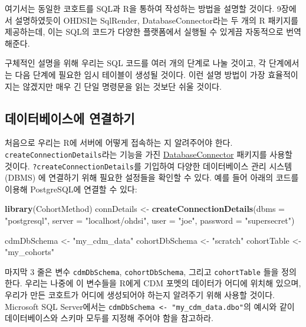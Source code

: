 \documentclass[11pt]{book}
\newenvironment{Shaded}{\begin{snugshade}}{\end{snugshade}}
\newcommand{\KeywordTok}[1]{\textcolor[rgb]{0.13,0.29,0.53}{\textbf{#1}}}
\newcommand{\DataTypeTok}[1]{\textcolor[rgb]{0.13,0.29,0.53}{#1}}
\newcommand{\StringTok}[1]{\textcolor[rgb]{0.31,0.60,0.02}{#1}}
\newcommand{\NormalTok}[1]{#1}
\theoremstyle{definition}
\theoremstyle{definition}
\theoremstyle{definition}
\theoremstyle{remark}
\begin{document}
여기서는 동일한 코호트를 SQL과 R을 통하여 작성하는 방법을 설명할 것이다.
9장에서 설명하였듯이 OHDSI는 SqlRender, DatabaseConnector라는 두 개의 R
패키지를 제공하는데, 이는 SQL의 코드가 다양한 플랫폼에서 실행될 수
있게끔 자동적으로 번역해준다.

구체적인 설명을 위해 우리는 SQL 코드를 여러 개의 단계로 나눌 것이고, 각
단계에서는 다음 단계에 필요한 임시 테이블이 생성될 것이다. 이런 설명
방법이 가장 효율적이지는 않겠지만 매우 긴 단일 명령문을 읽는 것보단 쉬울
것이다.

\subsection{데이터베이스에 연결하기}\label{-}

처음으로 우리는 R에 서버에 어떻게 접속하는 지 알려주어야 한다.
\texttt{createConnectionDetails}라는 기능을 가진
\href{https://ohdsi.github.io/DatabaseConnector/}{DatabaseConnector}
패키지를 사용할 것이다. \texttt{?createConnectionDetails}를 기입하여
다양한 데이터베이스 관리 시스템 (DBMS) 에 연결하기 위해 필요한 설정들을
확인할 수 있다. 예를 들어 아래의 코드를 이용해 PostgreSQL에 연결할 수
있다:

\begin{Shaded}
\begin{Highlighting}[]
\KeywordTok{library}\NormalTok{(CohortMethod)}
\NormalTok{connDetails <-}\StringTok{ }\KeywordTok{createConnectionDetails}\NormalTok{(}\DataTypeTok{dbms =} \StringTok{"postgresql"}\NormalTok{,}
                                       \DataTypeTok{server =} \StringTok{"localhost/ohdsi"}\NormalTok{,}
                                       \DataTypeTok{user =} \StringTok{"joe"}\NormalTok{,}
                                       \DataTypeTok{password =} \StringTok{"supersecret"}\NormalTok{)}

\NormalTok{cdmDbSchema <-}\StringTok{ "my_cdm_data"}
\NormalTok{cohortDbSchema <-}\StringTok{ "scratch"}
\NormalTok{cohortTable <-}\StringTok{ "my_cohorts"}
\end{Highlighting}
\end{Shaded}

마지막 3 줄은 변수 \texttt{cdmDbSchema}, \texttt{cohortDbSchema}, 그리고
\texttt{cohortTable} 들을 정의한다. 우리는 나중에 이 변수들을 R에게 CDM
포멧의 데이터가 어디에 위치해 있으며, 우리가 만든 코호트가 어디에
생성되어야 하는지 알려주기 위해 사용할 것이다. Microsoft SQL
Server에서는 \texttt{cdmDbSchema\ \textless{}-\ "my\_cdm\_data.dbo"}의
예시와 같이 데이터베이스와 스키마 모두를 지정해 주어야 함을 참고하라.
\end{document}

